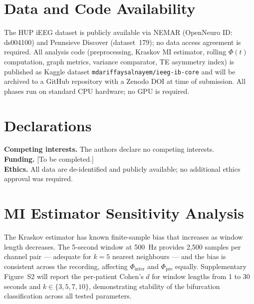 \documentclass[final,5p,times,twocolumn]{elsarticle}
\begin{document}
\section*{Data and Code Availability}

The HUP iEEG dataset is publicly available via NEMAR (OpenNeuro ID:
ds004100) and Pennsieve Discover (dataset~179); no data access agreement
is required.
%
All analysis code (preprocessing, Kraskov MI estimator, rolling $\Phi(t)$
computation, graph metrics, variance comparator, TE asymmetry index) is
published as Kaggle dataset \texttt{mdariffaysalnayem/ieeg-ib-core} and
will be archived to a GitHub repository with a Zenodo DOI at time of
submission.
%
All phases run on standard CPU hardware; no GPU is required.

\section*{Declarations}
\textbf{Competing interests.} The authors declare no competing interests.\\
\textbf{Funding.} [To be completed.]\\
\textbf{Ethics.} All data are de-identified and publicly available;
no additional ethics approval was required.

\appendix

\section{MI Estimator Sensitivity Analysis}
\label{app:sensitivity}

The Kraskov estimator has known finite-sample bias that increases as
window length decreases.
%
The 5-second window at 500~Hz provides 2{,}500 samples per channel pair
--- adequate for $k = 5$ nearest neighbours --- and the bias is
consistent across the recording, affecting $\Phi_{\text{inter}}$ and
$\Phi_{\text{pre}}$ equally.
%
Supplementary Figure~S2 will report the per-patient Cohen's $d$ for
window lengths from 1 to 30 seconds and $k \in \{3, 5, 7, 10\}$,
demonstrating stability of the bifurcation classification across all
tested parameters.
\end{document}
